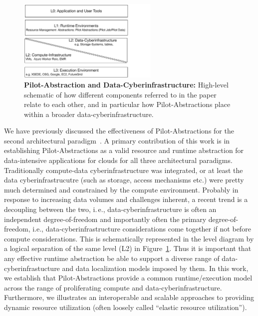 \documentclass[times]{cpeauth}
\newcommand{\pilot}{Pilot\xspace}
\begin{document}
\begin{figure}[t] 
\centering
\includegraphics[width=0.6\textwidth]{figures/data-intensive-arch.pdf}
\caption{\textbf{\pilot-Abstraction and Data-Cyberinfrastructure:} High-level schematic of how different components referred to
  in the paper relate to each other, and in particular how
  \pilot-Abstractions place within a broader data-cyberinfrastructure.}
\label{fig:figures_arch}
\end{figure}

We have previously discussed the effectiveness of \pilot-Abstractions
for the second architectural paradigm~\cite{pstar12}.  A primary contribution
of this work is in establishing \pilot-Abstractions as a valid
resource and runtime abstraction for data-intensive applications for
clouds for all three architectural paradigms.  Traditionally
compute-data cyberinfrastructure was integrated, or at least the data
cyberinfrastrucutre (such as storage, access mechanisms etc.)  were
pretty much determined and constrained by the compute environment.
Probably in response to increasing data volumes and challenges
inherent, a recent trend is a decoupling between the two, i.\,e.,
data-cyberinfrastructure is often an independent degree-of-freedom and
importantly often the primary degree-of-freedom, i.e.,
data-cyberinfrastructure considerations come together if not before
compute considerations.  This is schematically represented in the
level diagram by a logical separation of the same level (L2) in
Figure~\ref{fig:figures_arch}.  Thus it is important that any
effective runtime abstraction be able to support a diverse range of
data-cyberinfrastucture and data localization models imposed by them.
In this work, we establish that \pilot-Abstractions provide a common
runtime/execution model across the range of proliferating compute and
data-cyberinfrastructure.  Furthermore, we illustrates an
interoperable and scalable approaches to providing dynamic resource
utilization (often loosely called ``elastic resource utilization'').
\end{document}
